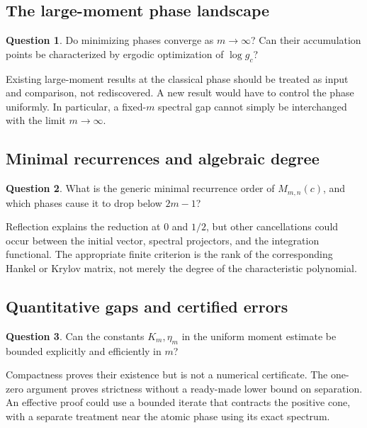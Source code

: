 \documentclass[11pt,a4paper]{article}
\numberwithin{equation}{section}
\theoremstyle{definition}
\newtheorem{question}[question]{Question}
\theoremstyle{remark}
\begin{document}
\subsection{The large-moment phase landscape}
\begin{question}
Do minimizing phases converge as $m\to\infty$? Can their accumulation
points be characterized by ergodic optimization of $\log g_c$?
\end{question}
Existing large-moment results at the classical phase \cite{BD} should
be treated as input and comparison, not rediscovered. A new result
would have to control the phase uniformly. In particular, a fixed-$m$
spectral gap cannot simply be interchanged with the limit $m\to\infty$.

\subsection{Minimal recurrences and algebraic degree}
\begin{question}
What is the generic minimal recurrence order of $M_{m,n}(c)$, and
which phases cause it to drop below $2m-1$?
\end{question}
Reflection explains the reduction at $0$ and $1/2$, but other
cancellations could occur between the initial vector, spectral
projectors, and the integration functional. The appropriate finite
criterion is the rank of the corresponding Hankel or Krylov matrix,
not merely the degree of the characteristic polynomial.

\subsection{Quantitative gaps and certified errors}
\begin{question}
Can the constants $K_m,\eta_m$ in the uniform moment estimate be bounded
explicitly and efficiently in $m$?
\end{question}
Compactness proves their existence but is not a numerical certificate.
The one-zero argument proves strictness without a ready-made lower
bound on separation. An effective proof could use a bounded iterate
that contracts the positive cone, with a separate treatment near the
atomic phase using its exact spectrum.
\end{document}
